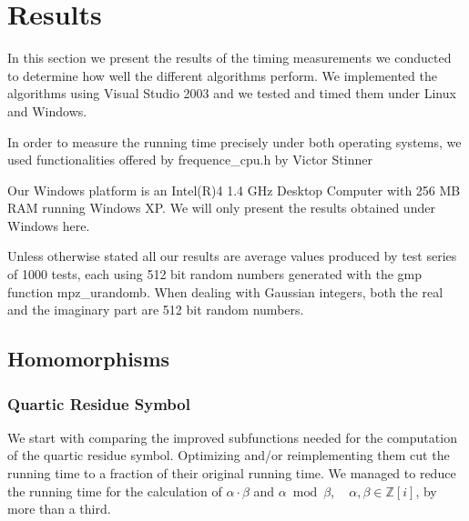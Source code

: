 \documentclass[a4paper, 11pt]{article}
\begin{document}
 \section{Results} 
 In this section we present the results of the timing measurements we conducted to determine how well the different 
 algorithms perform. We implemented the algorithms using Visual Studio 2003 and we tested  and timed them 
 under Linux and Windows. 
 
 In order to measure the running time precisely under both operating systems, we used functionalities offered by \ttfamily frequence\_cpu.h \normalfont by Victor Stinner \cite{stinner} 
 
 Our Windows platform is an Intel(R)4 1.4 GHz Desktop Computer with 256 MB RAM running Windows XP. We will only 
 present the results obtained under Windows here. 
 
 Unless otherwise stated all our results are average values produced by test series of 1000 tests, each using 512 bit random numbers generated with the gmp function 
 \ttfamily mpz\_urandomb\normalfont. When dealing with Gaussian integers, both the real and the imaginary part are 512 bit random numbers. 
 
 
 \subsection{Homomorphisms} 
 \subsubsection{Quartic Residue Symbol} 
 We start with comparing the improved subfunctions needed for the computation of the quartic residue symbol. Optimizing and/or reimplementing them cut the running time to a fraction of their original running time. We managed to reduce the running time for the calculation of $\alpha \cdot \beta$ and $\alpha \bmod \beta$, ~ 
 $\alpha, \beta \in \mathbb{Z}[i]$, by more than a third. 
 
\end{document}

